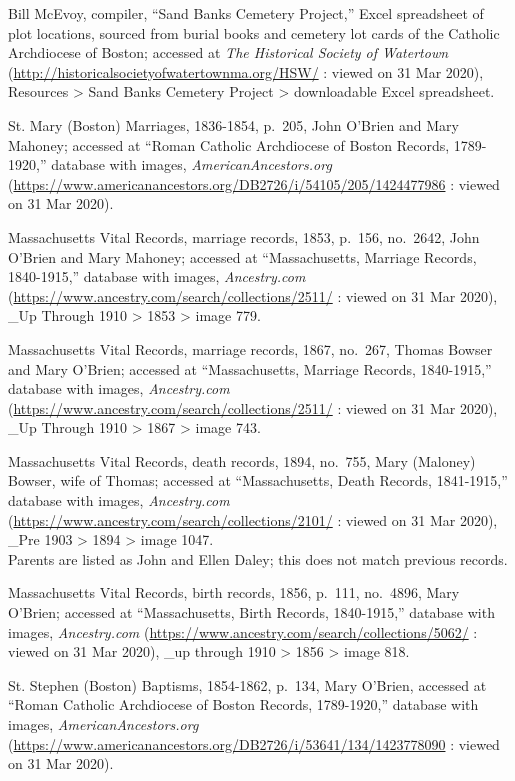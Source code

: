\begin{thebibliography}{999}
	Bill McEvoy, compiler, ``Sand Banks Cemetery Project,'' Excel spreadsheet of plot locations, sourced from burial books and cemetery lot cards of the Catholic Archdiocese of Boston; accessed at \textit{The Historical Society of Watertown} (\url{http://historicalsocietyofwatertownma.org/HSW/} : viewed on 31 Mar 2020), Resources > Sand Banks Cemetery Project > downloadable Excel spreadsheet.
	
	St. Mary (Boston) Marriages, 1836-1854, p.\ 205, John O'Brien and Mary Mahoney; accessed at ``Roman Catholic Archdiocese of Boston Records, 1789-1920,'' database with images, \textit{AmericanAncestors.org} (\url{https://www.americanancestors.org/DB2726/i/54105/205/1424477986} : viewed on 31 Mar 2020).
	
	Massachusetts Vital Records, marriage records, 1853, p.\ 156, no.\ 2642, John O'Brien and Mary Mahoney; accessed at ``Massachusetts, Marriage Records, 1840-1915,'' database with images, \textit{Ancestry.com} (\url{https://www.ancestry.com/search/collections/2511/} : viewed on 31 Mar 2020), \_Up Through 1910 > 1853 > image 779.
	
	Massachusetts Vital Records, marriage records, 1867, no.\ 267, Thomas Bowser and Mary O'Brien; accessed at ``Massachusetts, Marriage Records, 1840-1915,'' database with images, \textit{Ancestry.com} (\url{https://www.ancestry.com/search/collections/2511/} : viewed on 31 Mar 2020), \_Up Through 1910 > 1867 > image 743.
	
	Massachusetts Vital Records, death records, 1894, no.\ 755, Mary (Maloney) Bowser, wife of Thomas; accessed at ``Massachusetts, Death Records, 1841-1915,'' database with images, \textit{Ancestry.com} (\url{https://www.ancestry.com/search/collections/2101/} : viewed on 31 Mar 2020), \_Pre 1903 > 1894 > image 1047.\\
	Parents are listed as John and Ellen Daley; this does not match previous records.
	
	Massachusetts Vital Records, birth records, 1856, p.\ 111, no.\ 4896, Mary O'Brien; accessed at ``Massachusetts, Birth Records, 1840-1915,'' database with images, \textit{Ancestry.com} (\url{https://www.ancestry.com/search/collections/5062/} : viewed on 31 Mar 2020), \_up through 1910 > 1856 > image 818.
	
	St. Stephen (Boston) Baptisms, 1854-1862, p.\ 134, Mary O'Brien, accessed at ``Roman Catholic Archdiocese of Boston Records, 1789-1920,'' database with images, \textit{AmericanAncestors.org} (\url{https://www.americanancestors.org/DB2726/i/53641/134/1423778090} : viewed on 31 Mar 2020).
	

\end{thebibliography}
